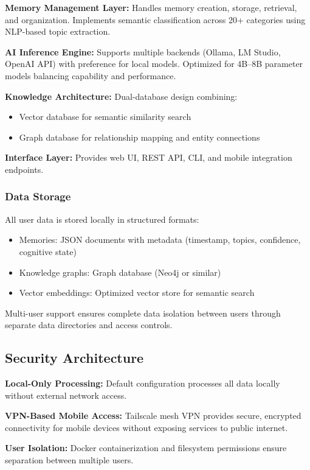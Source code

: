 \documentclass[11pt,letterpaper]{article}
\begin{document}
\textbf{Memory Management Layer:} Handles memory creation, storage, retrieval, and organization. Implements semantic classification across 20+ categories using NLP-based topic extraction.

\textbf{AI Inference Engine:} Supports multiple backends (Ollama, LM Studio, OpenAI API) with preference for local models. Optimized for 4B--8B parameter models balancing capability and performance.

\textbf{Knowledge Architecture:} Dual-database design combining:
\begin{itemize}
\item Vector database for semantic similarity search
\item Graph database for relationship mapping and entity connections
\end{itemize}

\textbf{Interface Layer:} Provides web UI, REST API, CLI, and mobile integration endpoints.

\subsubsection{Data Storage}

All user data is stored locally in structured formats:
\begin{itemize}
\item Memories: JSON documents with metadata (timestamp, topics, confidence, cognitive state)
\item Knowledge graphs: Graph database (Neo4j or similar)
\item Vector embeddings: Optimized vector store for semantic search
\end{itemize}

Multi-user support ensures complete data isolation between users through separate data directories and access controls.

\subsection{Security Architecture}

\textbf{Local-Only Processing:} Default configuration processes all data locally without external network access.

\textbf{VPN-Based Mobile Access:} Tailscale mesh VPN provides secure, encrypted connectivity for mobile devices without exposing services to public internet.

\textbf{User Isolation:} Docker containerization and filesystem permissions ensure separation between multiple users.
\end{document}
